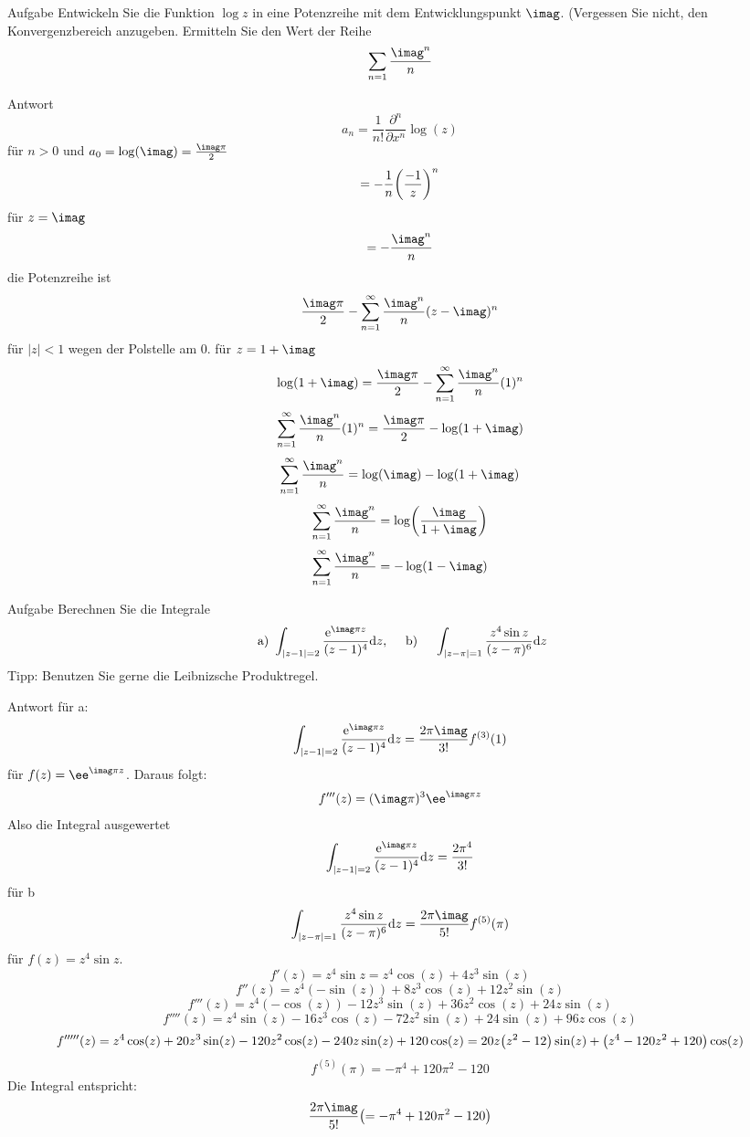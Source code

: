 \documentclass{scrartcl}
\begin{document}
\begin{section}{Aufgabe}%
    Entwickeln Sie die Funktion \( \log z \) in eine Potenzreihe mit dem Entwicklungspunkt $\imag$. (Vergessen Sie nicht, den Konvergenzbereich anzugeben. Ermitteln Sie den Wert der Reihe \[ \sum_{n=1} \frac{\imag^{n}}{n} \] 
    \begin{subsection}{Antwort}
        \[a_n=\frac{1}{n!}\frac{\partial^n}{\partial x^n}\log(z)\] für $n>0$
        und $a_0=\log(\imag)=\frac{\imag \pi}{2}$
        \[=-\frac{1}{n}\qty(\frac{-1}{z})^n\]
        für $z=\imag$
        \[=-\frac{\imag^n}{n}\]
        die Potenzreihe ist
        \[\frac{\imag \pi}{2}-\sum_{n=1}^\infty\frac{\imag^{n}}{n}(z-\imag)^n \] für $|z|<1$ wegen der Polstelle am $0$.
        für $z=1+\imag$
        \[\log(1+\imag)=\frac{\imag \pi}{2}-\sum_{n=1}^\infty\frac{\imag^{n}}{n}(1)^n\]
        \[\sum_{n=1}^\infty\frac{\imag^{n}}{n}(1)^n=\frac{\imag \pi}{2}-\log(1+\imag)\]
        \[\sum_{n=1}^\infty\frac{\imag^{n}}{n}=\log(\imag)-\log(1+\imag)\]
        \[\sum_{n=1}^\infty\frac{\imag^{n}}{n}=\log(\frac{\imag}{1+\imag})\]
        \[\sum_{n=1}^\infty\frac{\imag^{n}}{n}=-\log(1-\imag)\]
    \end{subsection}
\end{section}
\begin{section}{Aufgabe}
    Berechnen Sie die Integrale \[ \text { a) } \int_{|z-1|=2} \frac{\mathrm{e}^{\imag \pi z}}{(z-1)^{4}} \dd z, \quad \text { b) } \quad \int_{|z-\pi|=1} \frac{z^{4} \sin z}{(z-\pi)^{6}} \dd z \] Tipp: Benutzen Sie gerne die Leibnizsche Produktregel.
      \begin{subsection}{Antwort}
        für a:
        \[\int_{|z-1|=2} \frac{\mathrm{e}^{\imag \pi z}}{(z-1)^{4}} \dd z=\frac{2 \pi \imag}{3!}f^{(3)}(1) \]
        für $f(z)=\ee^{\imag \pi z}$.
        Daraus folgt: \[f'''(z)=(\imag\pi)^3\ee^{\imag \pi z}\]
        Also die Integral ausgewertet 
        \[\int_{|z-1|=2} \frac{\mathrm{e}^{\imag \pi z}}{(z-1)^{4}} \dd z=\frac{2 \pi^4}{3!}\]
        für b
        \[\int_{|z-\pi|=1} \frac{z^{4} \sin z}{(z-\pi)^{6}} \dd z=\frac{2 \pi \imag}{5!}f^{(5)}(\pi) \]
        für $f(z)=z^4 \sin{z}$.
        \[f'(z)=z^4 \sin{z}=z^4 \cos (z)+4 z^3 \sin (z)\]
        \[f''(z)=z^4 (-\sin (z))+8 z^3 \cos (z)+12 z^2 \sin (z)\]
        \[f'''(z)=z^4 (-\cos (z))-12 z^3 \sin (z)+36 z^2 \cos (z)+24 z \sin (z)\]
        \[f''''(z)=z^4 \sin (z)-16 z^3 \cos (z)-72 z^2 \sin (z)+24 \sin (z)+96 z \cos (z)\]
        \[f'''''(z)=z^4 \cos (z)+20 z^3 \sin (z)-120 z^2 \cos (z)-240 z \sin (z)+120 \cos (z)
        =20 z \qty(z^2-12) \sin (z)+\qty(z^4-120 z^2+120) \cos (z)\]
        \[f^{(5)}(\pi)=-\pi ^4+120 \pi ^2-120\]
        Die Integral entspricht:
        \[\frac{2 \pi \imag}{5!}\qty(=-\pi ^4+120 \pi ^2-120)\]
    \end{subsection}  
\end{section}
\end{document}
